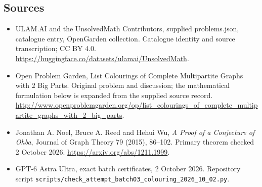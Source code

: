 \documentclass[11pt,a4paper]{article}
\begin{document}
\subsection{Sources}
\begin{itemize}
\item[S1] ULAM.AI and the UnsolvedMath Contributors, supplied problems.json, catalogue entry, OpenGarden collection. Catalogue identity and source transcription; CC BY 4.0.
\url{https://huggingface.co/datasets/ulamai/UnsolvedMath}.
\item[S2] Open Problem Garden, List Colourings of Complete Multipartite Graphs with 2 Big Parts. Original problem and discussion; the mathematical formulation below is expanded from the supplied source record.
\url{http://www.openproblemgarden.org/op/list_colourings_of_complete_multipartite_graphs_with_2_big_parts}.

\item[R1] Jonathan A. Noel, Bruce A. Reed and Hehui Wu,
\emph{A Proof of a Conjecture of Ohba}, Journal of Graph Theory
79 (2015), 86--102. Primary theorem checked 2 October 2026.
\url{https://arxiv.org/abs/1211.1999}.
\item[R2] GPT-6 Astra Ultra, exact batch certificates, 2 October 2026.
Repository script \texttt{scripts/check\_attempt\_batch03\_colouring\_2026\_10\_02.py}.

\end{itemize}
\end{document}
